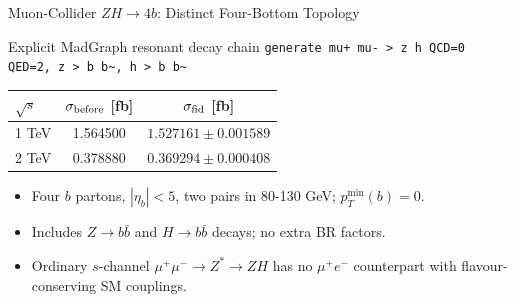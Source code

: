 \documentclass[aspectratio=1610,english]{beamer}
\newcommand{\src}[1]{\vfill{\par\color{black!65}\fontsize{6.4}{7.4}\selectfont\emph{Source:} #1\par}}
\begin{document}
\begin{frame}[t]{Muon-Collider $ZH\to4b$: Distinct Four-Bottom Topology}
\small

\begin{block}{Explicit MadGraph resonant decay chain}
\texttt{generate mu+ mu- > z h QCD=0 QED=2, z > b b\textasciitilde{}, h > b b\textasciitilde{}}
\end{block}
\begin{center}\begin{tabular}{lcc}\toprule
$\sqrt{s}$ & $\sigma_{\rm before}$ [fb] & $\sigma_{\rm fid}$ [fb]\\\midrule
1 TeV & 1.564500 & $1.527161\pm0.001589$\\
2 TeV & 0.378880 & $0.369294\pm0.000408$\\\bottomrule
\end{tabular}\end{center}
\begin{itemize}
\justifying 
\item Four $b$ partons, $|\eta_b|<5$, two pairs in 80-130 GeV; $p_T^{\min}(b)=0$.
\item Includes $Z\to b\bar b$ and $H\to b\bar b$ decays; no extra BR factors.
\item Ordinary $s$-channel $\mu^+\mu^-\to Z^*\to ZH$ has no $\mu^+e^-$ counterpart with flavour-conserving SM couplings.
\end{itemize}

\end{frame}
\end{document}
